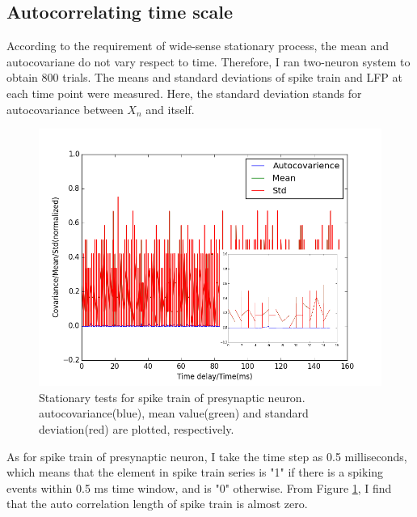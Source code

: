 \documentclass{article}
\begin{document}
		\subsection{Autocorrelating time scale}
			According to the requirement of wide-sense stationary process, the mean and autocovariane do not vary respect to time. Therefore, I ran two-neuron system to obtain 800 trials. The means and standard deviations of spike train and LFP at each time point were measured. Here, the standard deviation stands for autocovariance between $X_n$ and itself.
			\begin{figure}[ht]
				\centering
				\includegraphics[scale = 0.5]{n1sb_comb.png}
				\caption{Stationary tests for spike train of presynaptic neuron. autocovariance(blue), mean value(green) and standard deviation(red) are plotted, respectively.}
				\label{fig:spike_auto}
			\end{figure}
			As for spike train of presynaptic neuron, I take the time step as 0.5 milliseconds, which means that the element in spike train series is "1" if there is a spiking events within 0.5 ms time window, and is "0" otherwise. From Figure \ref{fig:spike_auto}, I find that the auto correlation length of spike train is almost zero.
\end{document}
